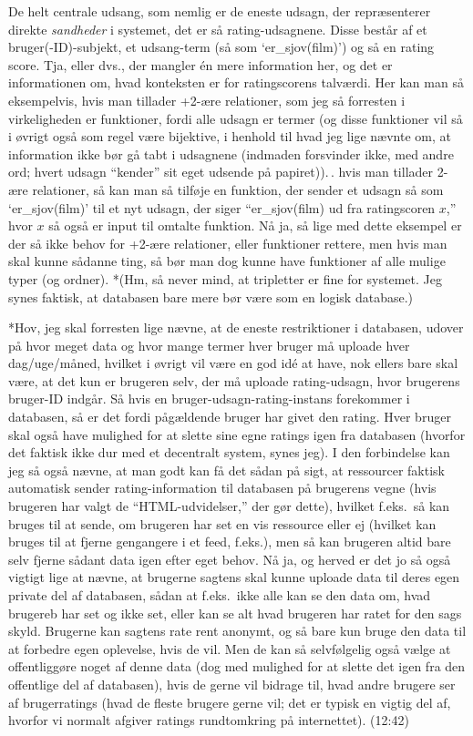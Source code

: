\documentclass{report}
\begin{document}
De helt centrale udsang, som nemlig er de eneste udsagn, der repræsenterer direkte \emph{sandheder} i systemet, det er så rating-udsagnene. Disse består af et bruger(-ID)-subjekt, et udsang-term (så som `er\_sjov(film)') og så en rating score. Tja, eller dvs., der mangler én mere information her, og det er informationen om, hvad konteksten er for ratingscorens talværdi. Her kan man så eksempelvis, hvis man tillader +2-ære relationer, som jeg så forresten i virkeligheden er funktioner, fordi alle udsagn er termer (og disse funktioner vil så i øvrigt også som regel være bijektive, i henhold til hvad jeg lige nævnte om, at information ikke bør gå tabt i udsagnene (indmaden forsvinder ikke, med andre ord; hvert udsagn ``kender'' sit eget udsende på papiret)).\,. hvis man tillader 2-ære relationer, så kan man så tilføje en funktion, der sender et udsagn så som `er\_sjov(film)' til et nyt udsagn, der siger ``er\_sjov(film) ud fra ratingscoren $x$,'' hvor $x$ så også er input til omtalte funktion. Nå ja, så lige med dette eksempel er der så ikke behov for +2-ære relationer, eller funktioner rettere, men hvis man skal kunne sådanne ting, så bør man dog kunne have funktioner af alle mulige typer (og ordner). *(Hm, så never mind, at tripletter er fine for systemet. Jeg synes faktisk, at databasen bare mere bør være som en logisk database.)

*Hov, jeg skal forresten lige nævne, at de eneste restriktioner i databasen, udover på hvor meget data og hvor mange termer hver bruger må uploade hver dag/uge/måned, hvilket i øvrigt vil være en god idé at have, nok ellers bare skal være, at det kun er brugeren selv, der må uploade rating-udsagn, hvor brugerens bruger-ID indgår. Så hvis en bruger-udsagn-rating-instans forekommer i databasen, så er det fordi pågældende bruger har givet den rating. Hver bruger skal også have mulighed for at slette sine egne ratings igen fra databasen (hvorfor det faktisk ikke dur med et decentralt system, synes jeg). I den forbindelse kan jeg så også nævne, at man godt kan få det sådan på sigt, at ressourcer faktisk automatisk sender rating-information til databasen på brugerens vegne (hvis brugeren har valgt de ``HTML-udvidelser,'' der gør dette), hvilket f.eks.\ så kan bruges til at sende, om brugeren har set en vis ressource eller ej (hvilket kan bruges til at fjerne gengangere i et feed, f.eks.), men så kan brugeren altid bare selv fjerne sådant data igen efter eget behov. Nå ja, og herved er det jo så også vigtigt lige at nævne, at brugerne sagtens skal kunne uploade data til deres egen private del af databasen, sådan at f.eks.\ ikke alle kan se den data om, hvad brugereb har set og ikke set, eller kan se alt hvad brugeren har ratet for den sags skyld. Brugerne kan sagtens rate rent anonymt, og så bare kun bruge den data til at forbedre egen oplevelse, hvis de vil. Men de kan så selvfølgelig også vælge at offentliggøre noget af denne data (dog med mulighed for at slette det igen fra den offentlige del af databasen), hvis de gerne vil bidrage til, hvad andre brugere ser af brugerratings (hvad de fleste brugere gerne vil; det er typisk en vigtig del af, hvorfor vi normalt afgiver ratings rundtomkring på internettet). (12:42)
\end{document}

